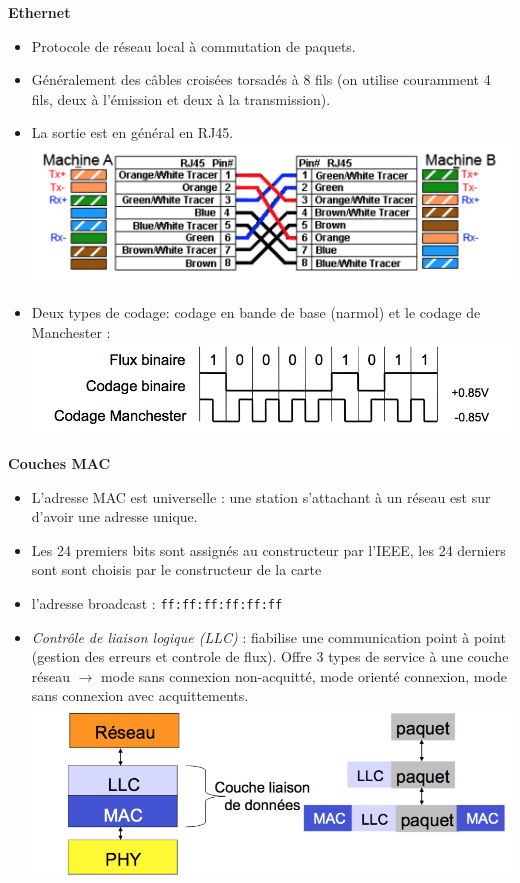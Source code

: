 \documentclass[a4paper,9pt, twocolumn]{article}
\begin{document}
	\textbf{Ethernet}
	\begin{itemize}
		\item Protocole de réseau local à commutation de paquets.
		\item Généralement des câbles croisées torsadés à 8 fils (on utilise couramment 4 fils, deux à l'émission et deux à la transmission).
		\item La sortie est en général en RJ45.
			\includegraphics[scale=0.4]{RJ.png}
		\item Deux types de codage: codage en bande de base (narmol) et le codage de Manchester :
			\includegraphics[scale=0.4]{code.png}
	\end{itemize}

	\textbf{Couches MAC}
	\begin{itemize}
		\item L'adresse MAC est universelle : une station s'attachant à un réseau est sur d'avoir une adresse unique. 
		\item Les 24 premiers bits sont assignés au constructeur par l'IEEE, les 24 derniers sont sont choisis par le constructeur de la carte
		\item l'adresse broadcast : \texttt{ff:ff:ff:ff:ff:ff}
		\item \textit{Contrôle de liaison logique (LLC)} : fiabilise une communication point à point (gestion des erreurs et controle de flux).
			Offre 3 types de service à une couche réseau $\longrightarrow$ mode sans connexion non-acquitté, mode orienté connexion, mode sans connexion avec acquittements.		
			\includegraphics[scale=0.4]{LLC.png}
	\end{itemize}
\end{document}
